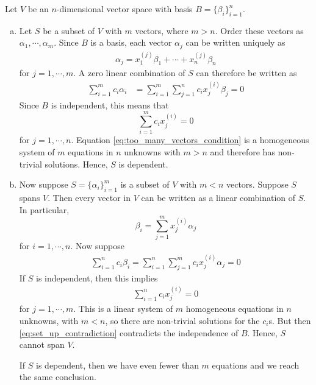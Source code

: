 \documentclass[12pt,letterpaper,reqno]{article}
\numberwithin{equation}{section}
\begin{document}
\begin{pf}
Let $V$ be an $n$-dimensional vector space with basis $B=\{\beta_i\}_{i=1}^n$. 
	\begin{enumerate}[(a)]
		\item Let $S$ be a subset of $V$ with $m$ vectors, where $m>n$. Order these vectors as $\alpha_1,\cdots,\alpha_m$. Since $B$ is a basis, each vector $\alpha_j$ can be written uniquely as 
		\begin{align*}
			\alpha_j=x_1^{(j)}\beta_1+\cdots + x_n^{(j)}\beta_n
		\end{align*}
for $j=1,\cdots,m$. A zero linear combination of $S$ can therefore be written as 
\begin{align*}
	\sum_{i=1}^m c_i\alpha_i &=\sum_{i=1}^m\sum_{j=1}^nc_ix_j^{(i)}\beta_j=0
\end{align*}
Since $B$ is independent, this means that
\begin{equation}\label{eq:too_many_vectors_condition}
	\sum_{i=1}^mc_ix_j^{(i)}=0
\end{equation}
for $j=1,\cdots,n$. Equation \eqref{eq:too_many_vectors_condition} is a homogeneous system of $m$ equations in $n$ unknowns with $m>n$ and therefore has non-trivial solutions. Hence, $S$ is dependent.
\item Now suppose $S=\{\alpha_i\}_{i=1}^m$ is a subset of $V$ with $m<n$ vectors. Suppose $S$ spans $V$. Then every vector in $V$ can be written as a linear combination of $S$. In particular, 
\begin{equation}
	\beta_i=\sum_{j=1}^m x_j^{(i)}\alpha_j
\end{equation}
for $i=1,\cdots,n$. Now suppose
\begin{align}\label{eq:set_up_contradiction}
	\sum_{i=1}^nc_i\beta_i=\sum_{i=1}^n\sum_{j=1}^mc_ix_j^{(i)}\alpha_j=0
\end{align}
If $S$ is independent, then this implies
\begin{align*}
	\sum_{i=1}^nc_ix_j^{(i)}=0
\end{align*}
for $j=1,\cdots,m$. This is a linear system of $m$ homogeneous equations in $n$ unknowns, with $m<n$, so there are non-trivial solutions for the $c_i$s. But then \eqref{eq:set_up_contradiction} contradicts the independence of $B$. Hence, $S$ cannot span $V$.

If $S$ is dependent, then we have even fewer than $m$ equations and we reach the same conclusion.
	\end{enumerate}
\end{pf}
\end{document}
